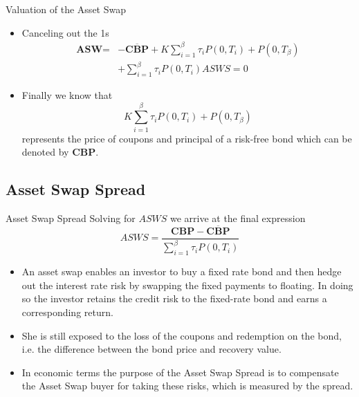 \documentclass{beamer}
\begin{document}
\begin{frame}{Valuation of the Asset Swap}
	\begin{itemize}
		\item Canceling out the 1s
		\begin{equation*}
			\begin{aligned}
				\textbf{ASW}=&-\overline{\textbf{CBP}}+K\sum_{i=1}^\beta\tau_i P(0,T_i) +P(0,T_\beta) \\
				& + \sum_{i=1}^{\beta}\tau_i P(0,T_i)ASWS=0
			\end{aligned}
		\end{equation*}
		\item Finally we know that
		\begin{equation*}
			K\sum_{i=1}^\beta\tau_i P(0,T_i) + P(0,T_\beta)
		\end{equation*}
		represents the price of coupons and principal of a  risk-free bond which can be denoted by \textbf{CBP}.
	\end{itemize}
\end{frame}

\subsection{Asset Swap Spread}
\begin{frame}{Asset Swap Spread}
	Solving for $ASWS$ we arrive at the final expression
	\begin{equation}
		ASWS = \frac{\textbf{CBP}-\overline{\textbf{CBP}}}{\sum_{i=1}^{\beta}\tau_iP(0,T_i)}
	\end{equation}
	\begin{itemize}
	\item<2-> An asset swap enables an investor to buy a fixed rate bond and then hedge out the interest rate risk by swapping the fixed payments to floating. In doing so the investor retains the credit risk to the fixed-rate bond and earns a corresponding return. 
	\item<3-> She is still exposed to the loss of the coupons and redemption on the bond, i.e. the difference between the bond price and recovery value.
	\item<4-> In economic terms the purpose of the Asset Swap Spread is to compensate the Asset Swap buyer for taking these risks, which is measured by the spread.
	\end{itemize}
\end{frame}
\end{document}
